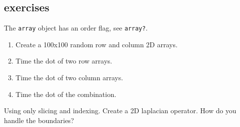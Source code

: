 \subsection{exercises}

\begin{frame}
 The {\tt array} object has an order flag, see {\tt array?}.
\begin{enumerate}
\item Create a 100x100 random row and column 2D arrays.
\item Time the dot of two row arrays.
\item Time the dot of two column arrays.
\item Time the dot of the combination.
\end{enumerate}

Using only slicing and indexing.  Create a 2D laplacian operator. How do you
handle the boundaries?
\end{frame}
